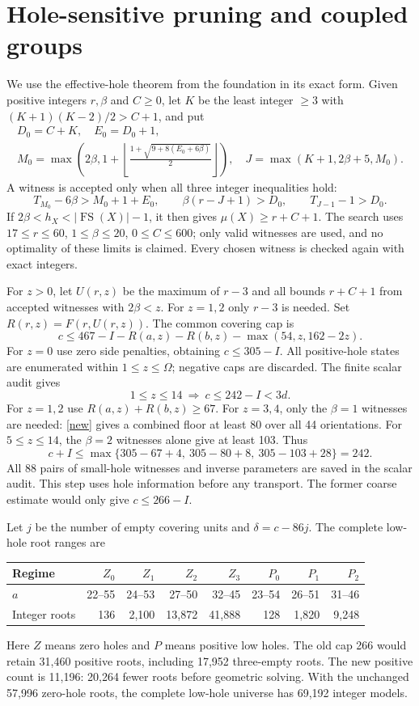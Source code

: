\documentclass[11pt,a4paper]{article}
\newcommand{\FS}{\operatorname{FS}}
\begin{document}
\section{Hole-sensitive pruning and coupled groups}
We use the effective-hole theorem from the foundation in its exact form.
Given positive integers $r,\beta$ and $C\ge0$, let $K$ be the least
integer $\ge3$ with $(K+1)(K-2)/2>C+1$, and put
\begin{gather*}
 D_0=C+K,\quad E_0=D_0+1,\\
 M_0=\max\left(2\beta,1+\left\lfloor
 \frac{1+\sqrt{9+8(E_0+6\beta)}}2\right\rfloor\right),\quad
 J=\max(K+1,2\beta+5,M_0).
\end{gather*}
A witness is accepted only when all three integer inequalities hold:
\[
 T_{M_0}-6\beta>M_0+1+E_0,\qquad
 \beta(r-J+1)>D_0,\qquad T_{J-1}-1>D_0.
\]
If $2\beta<h_X<|\FS(X)|-1$, it then gives $\mu(X)\ge r+C+1$.
The search uses $17\le r\le60$, $1\le\beta\le20$, $0\le C\le600$;
only valid witnesses are used, and no optimality of these limits is
claimed. Every chosen witness is checked again with exact integers.

For $z>0$, let $U(r,z)$ be the maximum of $r-3$ and all bounds
$r+C+1$ from accepted witnesses with $2\beta<z$.
For $z=1,2$ only $r-3$ is needed. Set $R(r,z)=F(r,U(r,z))$.
The common covering cap is
\begin{equation}\label{cap}
 c\le467-I-R(a,z)-R(b,z)-\max(54,z,162-2z).
\end{equation}
For $z=0$ use zero side penalties, obtaining $c\le305-I$.
All positive-hole states are enumerated within $1\le z\le\Omega$;
negative caps are discarded. The finite scalar audit gives
\[
 1\le z\le14\ \Longrightarrow\ c\le242-I<3d.
\]
For $z=1,2$ use $R(a,z)+R(b,z)\ge67$. For $z=3,4$, only the
$\beta=1$ witnesses are needed: \eqref{new} gives a combined floor
at least 80 over all 44 orientations. For $5\le z\le14$, the
$\beta=2$ witnesses alone give at least 103. Thus
\[
 c+I\le\max\{305-67+4,\ 305-80+8,\ 305-103+28\}=242.
\]
All 88 pairs of small-hole witnesses and inverse parameters are saved
in the scalar audit. This step uses hole information before any transport.
The former coarse estimate would only give $c\le266-I$.

Let $j$ be the number of empty covering units and $\delta=c-86j$.
The complete low-hole root ranges are
\begin{center}\small
\begin{tabular}{lrrrrrrr}\toprule
Regime&$Z_0$&$Z_1$&$Z_2$&$Z_3$&$P_0$&$P_1$&$P_2$\\\midrule
$a$&22--55&24--53&27--50&32--45&23--54&26--51&31--46\\
Integer roots&136&2,100&13,872&41,888&128&1,820&9,248\\\bottomrule
\end{tabular}
\end{center}
Here $Z$ means zero holes and $P$ means positive low holes.
The old cap 266 would retain 31,460 positive roots, including 17,952
three-empty roots. The new positive count is 11,196: 20,264 fewer roots
before geometric solving. With the unchanged 57,996 zero-hole roots,
the complete low-hole universe has 69,192 integer models.
\end{document}
